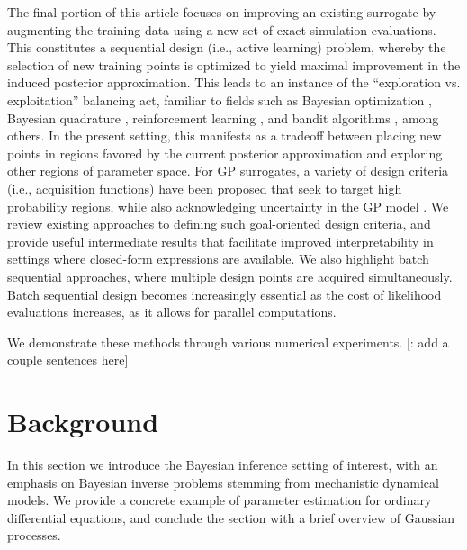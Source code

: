 \documentclass[12pt]{article}
\begin{document}
The final portion of this article focuses on improving an existing surrogate by augmenting the training data 
using a new set of exact simulation evaluations. This constitutes a sequential design (i.e., active learning) problem, 
whereby the selection of new training points is optimized to yield maximal improvement in the induced 
posterior approximation. This leads to an instance of the ``exploration vs. exploitation'' balancing act,
familiar to fields such as Bayesian optimization \citep{reviewBayesOpt}, Bayesian quadrature 
\citep{BayesQuadrature,BayesQuadratureAL,BayesQuadRatios}, reinforcement learning 
\citep{BadiaRL,LiuRL}, and bandit algorithms \citep{banditsEmpirical,LattimoreBandits}, among others.
In the present setting, this 
manifests as a tradeoff between placing new points in regions favored by the current posterior approximation
and exploring other regions of parameter space. For GP surrogates, a variety of 
design criteria (i.e., acquisition functions) have been proposed that seek to target high probability regions, 
while also acknowledging uncertainty in the GP model 
\citep{SinsbeckNowak,Surer2023sequential,KandasamyActiveLearning2015,weightedIVAR,VehtariParallelGP,VillaniAdaptiveGP}.
We review existing approaches to defining such goal-oriented design criteria, and provide useful intermediate results that 
facilitate improved interpretability in settings where closed-form expressions are available.
We also highlight batch sequential approaches, where multiple design points are acquired simultaneously. 
Batch sequential design becomes increasingly essential as the cost of likelihood evaluations increases, as it allows for 
parallel computations. 

We demonstrate these methods through various numerical experiments. [\todo: add a couple sentences here]

\section{Background}
In this section we introduce the Bayesian inference setting of interest, with an emphasis on Bayesian inverse problems
stemming from mechanistic dynamical models. We provide a concrete example of parameter estimation for ordinary 
differential equations, and conclude the section with a brief overview of Gaussian processes.
 
\end{document}

